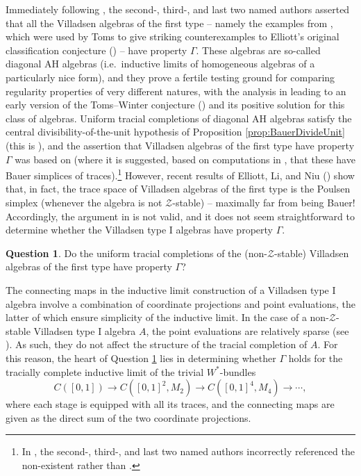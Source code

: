 \documentclass[a4paper,11pt]{amsart}
\theoremstyle{definition}
\newtheorem{question}[theorem]{Question}
\numberwithin{equation}{section}
\numberwithin{theorem}{section}
\newcommand{\Z}{\mathcal Z}
\begin{document}
Immediately following \cite[Proposition 5.10]{CETW}, the second-, third-, and last two named authors asserted that all the Villadsen algebras of the first type -- namely the examples from \cite{Vi98}, which were used by Toms to give striking counterexamples to Elliott's original classification conjecture (\cite{To08}) -- have property $\Gamma$. These algebras are so-called diagonal AH algebras (i.e.\ inductive limits of homogeneous algebras of a particularly nice form), and they prove a fertile testing ground for comparing regularity properties of very different natures, with the analysis in \cite{TW09} leading to an early version of the Toms--Winter conjecture (\cite[Remark 3.5]{TW09}) and its positive solution for this class of algebras.  Uniform tracial completions of diagonal AH algebras satisfy the central divisibility-of-the-unit hypothesis of Proposition \ref{prop:BauerDivideUnit} (this is \cite[Proposition 5.10]{CETW}), and the assertion that Villadsen algebras of the first type have property $\Gamma$ was based on \cite[Section 8]{TW09} (where it is suggested, based on computations in \cite[Theorem 4.1]{To09}, that these have Bauer simplices of traces).\footnote{In \cite{CETW}, the second-, third-, and last two named authors incorrectly referenced the non-existent \cite[Theorem~4.1]{To08} rather than \cite[Theorem 4.1]{To09}.} However, recent results of Elliott, Li, and Niu (\cite[Theorem 4.5]{ELN:preprint}) show that, in fact, the trace space of Villadsen algebras of the first type is the Poulsen simplex  (whenever the algebra is not $\mathcal Z$-stable) -- maximally far from being Bauer!  Accordingly, the argument in \cite{CETW} is not valid, and it does not seem straightforward to determine whether the Villadsen type I algebras have property $\Gamma$.
 


\begin{question}\label{Q:VA}
Do the uniform tracial completions of the (non-$\Z$-stable) Villadsen algebras of the first type have property $\Gamma$?
\end{question}

The connecting maps in the inductive limit construction of a Villadsen type I algebra involve a combination of coordinate projections and point evaluations, the latter of which ensure simplicity of the inductive limit.  In the case of a non-$\Z$-stable Villadsen type I algebra $A$, the point evaluations are relatively sparse (see \cite[Theorem 3.4 and Lemma 5.1]{TW09}). As such, they do not affect the structure of the tracial completion of $A$.  For this reason, the heart of Question \ref{Q:VA} lies in determining whether
$\Gamma$ holds for the tracially complete inductive limit of the trivial $W^*$-bundles
\begin{equation}
    C([0,1]) \to C([0,1]^2,M_2) \to C([0,1]^4, M_4) \to \cdots, 
\end{equation}
where each stage is equipped with all its traces, and the connecting maps are given as the direct sum of the two coordinate projections.
\end{document}
